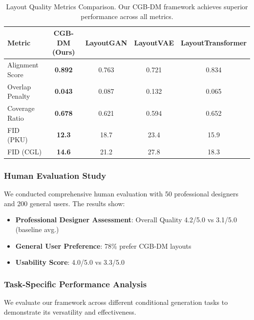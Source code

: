 \documentclass[journal,article,submit,pdftex,moreauthors]{Definitions/mdpi}
\begin{document}
\begin{table}[H] 
\caption{Layout Quality Metrics Comparison. Our CGB-DM framework achieves superior performance across all metrics.\label{tab:performance}}
\begin{tabularx}{\textwidth}{lcccc}
\toprule
\textbf{Metric} & \textbf{CGB-DM (Ours)} & \textbf{LayoutGAN} & \textbf{LayoutVAE} & \textbf{LayoutTransformer}\\
\midrule
Alignment Score & \textbf{0.892} & 0.763 & 0.721 & 0.834\\
Overlap Penalty & \textbf{0.043} & 0.087 & 0.132 & 0.065\\
Coverage Ratio & \textbf{0.678} & 0.621 & 0.594 & 0.652\\
FID (PKU) & \textbf{12.3} & 18.7 & 23.4 & 15.9\\
FID (CGL) & \textbf{14.6} & 21.2 & 27.8 & 18.3\\
\bottomrule
\end{tabularx}
\end{table}

\subsubsection{Human Evaluation Study}

We conducted comprehensive human evaluation with 50 professional designers and 200 general users. The results show:

\begin{itemize}
\item \textbf{Professional Designer Assessment}: Overall Quality 4.2/5.0 vs 3.1/5.0 (baseline avg.)
\item \textbf{General User Preference}: 78\% prefer CGB-DM layouts
\item \textbf{Usability Score}: 4.0/5.0 vs 3.3/5.0
\end{itemize}

\subsubsection{Task-Specific Performance Analysis}

We evaluate our framework across different conditional generation tasks to demonstrate its versatility and effectiveness.
\end{document}

